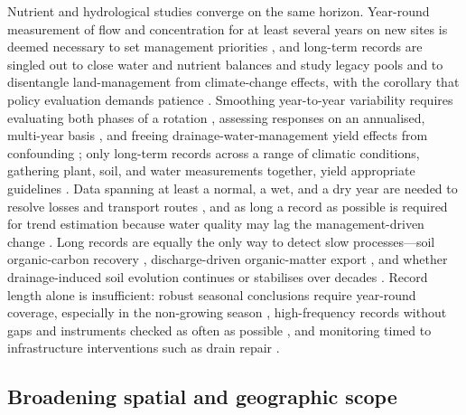 Nutrient and hydrological studies converge on the same horizon.
Year-round measurement of flow and concentration for at least several years
on new sites is deemed necessary to set management priorities
\parencite{Kladivko2001}, and long-term records are singled out to close
water and nutrient balances and study legacy pools \parencite{Sharpley2019}
and to disentangle land-management from climate-change effects, with the
corollary that policy evaluation demands patience
\parencite{Bauwe2020,Kelley2017,Gillingham2000,Lemke2011}. Smoothing
year-to-year variability requires evaluating both phases of a rotation
\parencite{Randall2003,Randall2005}, assessing responses on an annualised,
multi-year basis \parencite{Waring2024,Pittelkow2017}, and freeing
drainage-water-management yield effects from confounding
\parencite{Cooke2012}; only long-term records across a range of climatic
conditions, gathering plant, soil, and water measurements together, yield
appropriate guidelines \parencite{RANDALL1995}. Data spanning at least a
normal, a wet, and a dry year are needed to resolve losses and transport
routes \parencite{vanderSalm2012}, and as long a record as possible is
required for trend estimation because water quality may lag the
management-driven change \parencite{Ulén2007}. Long records are equally the
only way to detect slow processes---soil organic-carbon recovery
\parencite{Kumar2014}, discharge-driven organic-matter export
\parencite{Manninen2023}, and whether drainage-induced soil evolution
continues or stabilises over decades \parencite{Frison2009,Frankl2023}.
Record length alone is insufficient: robust seasonal conclusions require
year-round coverage, especially in the non-growing season
\parencite{Klaiber2020,VanEsbroeck2016}, high-frequency records without
gaps and instruments checked as often as possible \parencite{Hodaj2017},
and monitoring timed to infrastructure interventions such as drain repair
\parencite{Wesström2015}.

\subsection{Broadening spatial and geographic scope}

